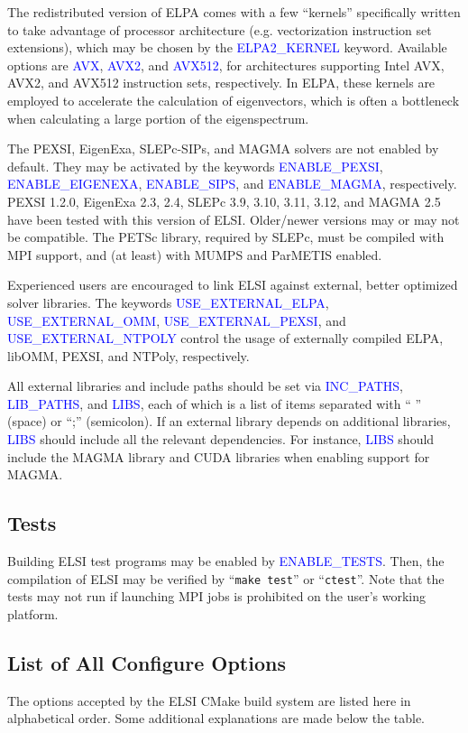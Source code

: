 \documentclass{report}
\newcommand{\tcb}[1]{\textcolor{blue}{#1}}
\begin{document}
The redistributed version of ELPA comes with a few ``kernels'' specifically written to take advantage of processor architecture (e.g. vectorization instruction set extensions), which may be chosen by the \tcb{ELPA2\_KERNEL} keyword. Available options are \tcb{AVX}, \tcb{AVX2}, and \tcb{AVX512}, for architectures supporting Intel AVX, AVX2, and AVX512 instruction sets, respectively. In ELPA, these kernels are employed to accelerate the calculation of eigenvectors, which is often a bottleneck when calculating a large portion of the eigenspectrum.

The PEXSI, EigenExa, SLEPc-SIPs, and MAGMA solvers are not enabled by default. They may be activated by the keywords \tcb{ENABLE\_PEXSI}, \tcb{ENABLE\_EIGENEXA}, \tcb{ENABLE\_SIPS}, and \tcb{ENABLE\_MAGMA}, respectively. PEXSI 1.2.0, EigenExa 2.3, 2.4, SLEPc 3.9, 3.10, 3.11, 3.12, and MAGMA 2.5 have been tested with this version of ELSI. Older/newer versions may or may not be compatible. The PETSc library, required by SLEPc, must be compiled with MPI support, and (at least) with MUMPS and ParMETIS enabled.

Experienced users are encouraged to link ELSI against external, better optimized solver libraries. The keywords \tcb{USE\_EXTERNAL\_ELPA}, \tcb{USE\_EXTERNAL\_OMM}, \tcb{USE\_EXTERNAL\_PEXSI}, and \tcb{USE\_EXTERNAL\_NTPOLY} control the usage of externally compiled ELPA, libOMM, PEXSI, and NTPoly, respectively.

All external libraries and include paths should be set via \tcb{INC\_PATHS}, \tcb{LIB\_PATHS}, and \tcb{LIBS}, each of which is a list of items separated with `` '' (space) or ``;'' (semicolon). If an external library depends on additional libraries, \tcb{LIBS} should include all the relevant dependencies. For instance, \tcb{LIBS} should include the MAGMA library and CUDA libraries when enabling support for MAGMA.

\subsection{Tests}
\label{subsec:config_tests}
Building ELSI test programs may be enabled by \tcb{ENABLE\_TESTS}. Then, the compilation of ELSI may be verified by ``\verb+make test+'' or ``\verb+ctest+''. Note that the tests may not run if launching MPI jobs is prohibited on the user's working platform.

\subsection{List of All Configure Options}
\label{subsec:config_options}
The options accepted by the ELSI CMake build system are listed here in alphabetical order. Some additional explanations are made below the table.
\end{document}
